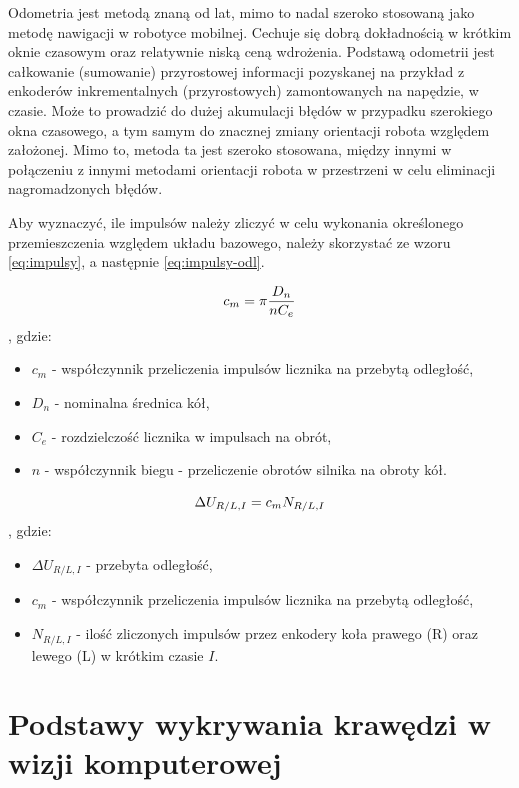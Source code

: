 Odometria jest metodą znaną od lat, mimo to nadal szeroko stosowaną jako metodę nawigacji w robotyce mobilnej. Cechuje się dobrą dokładnością w krótkim oknie czasowym oraz relatywnie niską ceną wdrożenia. Podstawą odometrii jest całkowanie (sumowanie) przyrostowej informacji pozyskanej na przykład z enkoderów inkrementalnych (przyrostowych) zamontowanych na napędzie, w czasie. Może to prowadzić do dużej akumulacji błędów w przypadku szerokiego okna czasowego, a tym samym do znacznej zmiany orientacji robota względem założonej. Mimo to, metoda ta jest szeroko stosowana, między innymi w połączeniu z innymi metodami orientacji  robota w przestrzeni w celu eliminacji nagromadzonych błędów. 

\hspace{1cm}

Aby wyznaczyć, ile impulsów należy zliczyć w celu wykonania określonego przemieszczenia względem układu bazowego, należy skorzystać ze wzoru \ref{eq:impulsy}, a następnie \ref{eq:impulsy-odl}.

\begin{equation}
    \centering
    c_m = \pi \frac{D_n}{n C_e}
    \label{eq:impulsy}
\end{equation}
, gdzie:
\begin{itemize}
    \item \(c_m\) - współczynnik przeliczenia impulsów licznika na przebytą odległość,
    \item \(D_n\) - nominalna średnica kół,
    \item \(C_e\) - rozdzielczość licznika w impulsach na obrót,
    \item \(n\) - współczynnik biegu - przeliczenie obrotów silnika na obroty kół.
\end{itemize}

\begin{equation}
    \centering
    \Delta U_{R/L, I} = c_m N_{R/L, I}
    \label{eq:impulsy-odl}
\end{equation}
, gdzie:
\begin{itemize}
    \item \(\Delta U_{R/L, I}\) - przebyta odległość,
    \item \(c_m\) -  współczynnik przeliczenia impulsów licznika na przebytą odległość,
    \item \(N_{R/L, I}\) - ilość zliczonych impulsów przez enkodery koła prawego (R) oraz lewego (L) w krótkim czasie \(I\). 
\end{itemize}

\section{Podstawy wykrywania krawędzi w wizji komputerowej}

